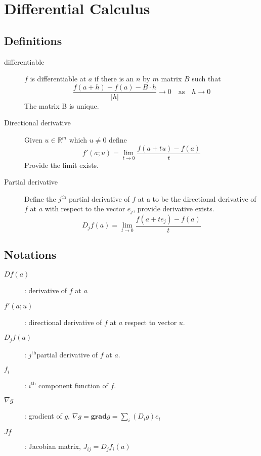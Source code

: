 \section{Differential Calculus}


\subsection{Definitions}
\begin{description}
\item[differentiable]
	\label{def:differentiable}
	$f$ is differentiable at $a$ if there is an $n$ by $m$ matrix $B$ such that
			\[\frac{f(a+h)-f(a)-B\cdot h}{|h|}\to 0
			\quad\textrm{as}\quad h \to 0\]
		The matrix B is unique.

\item[Directional derivative]
	\label{def:directional_derivative}
	Given $u\in \mathbb{R}^m$ which $u\neq 0$ define
		\[f'(a;u)=\lim_{t\to 0} \frac{f(a+tu)-f(a)}{t}\]
		Provide the limit exists.

\item[Partial derivative]
	\label{def:partial_derivative}
	Define the $j^\textrm{th}$ partial derivative of $f$ at a
		to be the directional derivative of $f$ at $a$ with
		respect to the vector $e_j$, provide derivative exists.
		\[D_jf(a)=\lim_{t\to 0}\frac{f(a+te_j)-f(a)}{t}\]

\end{description}

\subsection{Notations}
\begin{description}
	\item[$Df(a)$]    : derivative of $f$ at $a$
	\item[$f'(a;u)$]  : directional derivative of $f$ at $a$ respect to vector $u$.
	\item[$D_jf(a)$]  : $j^\textrm{th}$partial derivative of $f$ at $a$.
	\item[$f_i$]      : $i^\textrm{th}$ component function of $f$.
	\item[$\nabla g$] : gradient of $g$, $\nabla g = \mathbf{grad} g = \sum_i (D_ig)e_i$
	\item[$J f$]      : Jacobian matrix, $J_{ij} = D_jf_i(a)$
\end{description}

